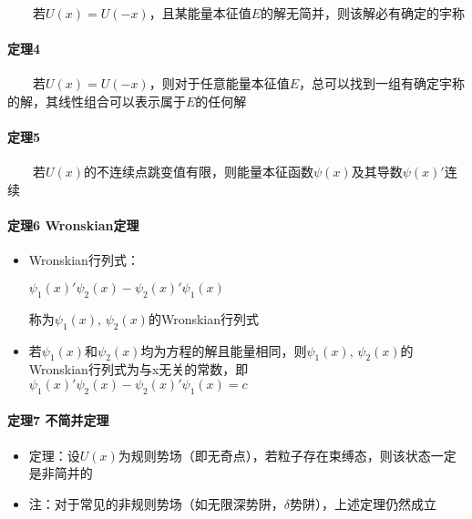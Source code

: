 \documentclass[UTF8,twocolumn]{ctexart}
\providecommand{\tightlist}{%
  \setlength{\itemsep}{0pt}\setlength{\parskip}{0pt}}
\let\oldparagraph\paragraph
\renewcommand{\paragraph}[1]{\oldparagraph{#1}\mbox{}}
\begin{document}
  若\(U(x)=U(-x)\)，且某能量本征值\(E\)的解无简并，则该解必有确定的宇称

\hypertarget{ux5b9aux74064}{%
\paragraph{{ }定理4}\label{ux5b9aux74064}}

  若\(U(x)=U(-x)\)，则对于任意能量本征值\(E\)，总可以找到一组有确定宇称的解，其线性组合可以表示属于\(E\)的任何解

\hypertarget{ux5b9aux74065}{%
\paragraph{{ }定理5}\label{ux5b9aux74065}}

  若\(U(x)\)的不连续点跳变值有限，则能量本征函数\(\psi(x)\)及其导数\(\psi(x)'\)连续

\hypertarget{ux5b9aux74066-wronskianux5b9aux7406}{%
\paragraph{{ }定理6
Wronskian定理}\label{ux5b9aux74066-wronskianux5b9aux7406}}

\begin{itemize}
\tightlist
\item
  Wronskian行列式：
  \begin{center}
    \(\psi_1(x)'\psi_2(x)-\psi_2(x)'\psi_1(x)\)
  \end{center}
  称为\(\psi_1(x),\,\psi_2(x)\)的Wronskian行列式
\item
  若\(\psi_1(x)\)和\(\psi_2(x)\)均为方程的解且能量相同，则\(\psi_1(x),\,\psi_2(x)\)的Wronskian行列式为与x无关的常数，即\(\psi_1(x)'\psi_2(x)-\psi_2(x)'\psi_1(x)=c\)
\end{itemize}

\hypertarget{ux5b9aux74067-ux4e0dux7b80ux5e76ux5b9aux7406}{%
\paragraph{{ }定理7
不简并定理}\label{ux5b9aux74067-ux4e0dux7b80ux5e76ux5b9aux7406}}

\begin{itemize}
\tightlist
\item
  定理：设\(U(x)\)为规则势场（即无奇点），若粒子存在束缚态，则该状态一定是非简并的
\item
  注：对于常见的非规则势场（如无限深势阱，\(\delta\)势阱），上述定理仍然成立
\end{itemize}
\end{document}
